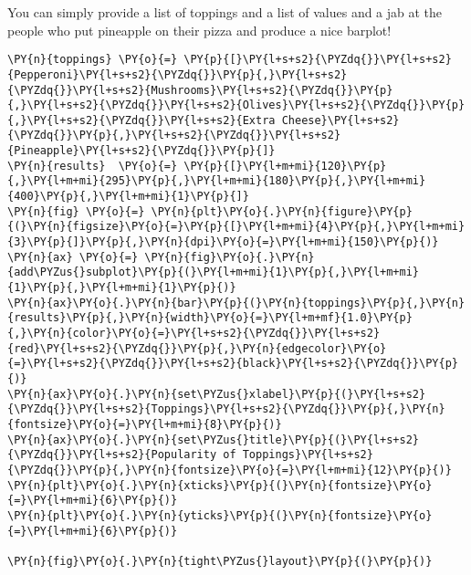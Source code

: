 You can simply provide a list of toppings and a list of values and a jab
at the people who put pineapple on their pizza and produce a nice
barplot!

    \begin{tcolorbox}[breakable, size=fbox, boxrule=1pt, pad at break*=1mm,colback=cellbackground, colframe=cellborder]
\begin{Verbatim}[commandchars=\\\{\}]
\PY{n}{toppings} \PY{o}{=} \PY{p}{[}\PY{l+s+s2}{\PYZdq{}}\PY{l+s+s2}{Pepperoni}\PY{l+s+s2}{\PYZdq{}}\PY{p}{,}\PY{l+s+s2}{\PYZdq{}}\PY{l+s+s2}{Mushrooms}\PY{l+s+s2}{\PYZdq{}}\PY{p}{,}\PY{l+s+s2}{\PYZdq{}}\PY{l+s+s2}{Olives}\PY{l+s+s2}{\PYZdq{}}\PY{p}{,}\PY{l+s+s2}{\PYZdq{}}\PY{l+s+s2}{Extra Cheese}\PY{l+s+s2}{\PYZdq{}}\PY{p}{,}\PY{l+s+s2}{\PYZdq{}}\PY{l+s+s2}{Pineapple}\PY{l+s+s2}{\PYZdq{}}\PY{p}{]}
\PY{n}{results}  \PY{o}{=} \PY{p}{[}\PY{l+m+mi}{120}\PY{p}{,}\PY{l+m+mi}{295}\PY{p}{,}\PY{l+m+mi}{180}\PY{p}{,}\PY{l+m+mi}{400}\PY{p}{,}\PY{l+m+mi}{1}\PY{p}{]}
\PY{n}{fig} \PY{o}{=} \PY{n}{plt}\PY{o}{.}\PY{n}{figure}\PY{p}{(}\PY{n}{figsize}\PY{o}{=}\PY{p}{[}\PY{l+m+mi}{4}\PY{p}{,}\PY{l+m+mi}{3}\PY{p}{]}\PY{p}{,}\PY{n}{dpi}\PY{o}{=}\PY{l+m+mi}{150}\PY{p}{)} 
\PY{n}{ax} \PY{o}{=} \PY{n}{fig}\PY{o}{.}\PY{n}{add\PYZus{}subplot}\PY{p}{(}\PY{l+m+mi}{1}\PY{p}{,}\PY{l+m+mi}{1}\PY{p}{,}\PY{l+m+mi}{1}\PY{p}{)}
\PY{n}{ax}\PY{o}{.}\PY{n}{bar}\PY{p}{(}\PY{n}{toppings}\PY{p}{,}\PY{n}{results}\PY{p}{,}\PY{n}{width}\PY{o}{=}\PY{l+m+mf}{1.0}\PY{p}{,}\PY{n}{color}\PY{o}{=}\PY{l+s+s2}{\PYZdq{}}\PY{l+s+s2}{red}\PY{l+s+s2}{\PYZdq{}}\PY{p}{,}\PY{n}{edgecolor}\PY{o}{=}\PY{l+s+s2}{\PYZdq{}}\PY{l+s+s2}{black}\PY{l+s+s2}{\PYZdq{}}\PY{p}{)}
\PY{n}{ax}\PY{o}{.}\PY{n}{set\PYZus{}xlabel}\PY{p}{(}\PY{l+s+s2}{\PYZdq{}}\PY{l+s+s2}{Toppings}\PY{l+s+s2}{\PYZdq{}}\PY{p}{,}\PY{n}{fontsize}\PY{o}{=}\PY{l+m+mi}{8}\PY{p}{)}
\PY{n}{ax}\PY{o}{.}\PY{n}{set\PYZus{}title}\PY{p}{(}\PY{l+s+s2}{\PYZdq{}}\PY{l+s+s2}{Popularity of Toppings}\PY{l+s+s2}{\PYZdq{}}\PY{p}{,}\PY{n}{fontsize}\PY{o}{=}\PY{l+m+mi}{12}\PY{p}{)}
\PY{n}{plt}\PY{o}{.}\PY{n}{xticks}\PY{p}{(}\PY{n}{fontsize}\PY{o}{=}\PY{l+m+mi}{6}\PY{p}{)}
\PY{n}{plt}\PY{o}{.}\PY{n}{yticks}\PY{p}{(}\PY{n}{fontsize}\PY{o}{=}\PY{l+m+mi}{6}\PY{p}{)}

\PY{n}{fig}\PY{o}{.}\PY{n}{tight\PYZus{}layout}\PY{p}{(}\PY{p}{)}
\end{Verbatim}
\end{tcolorbox}

    \begin{center}
    \end{center}
    { \hspace*{\fill} \\}
    
